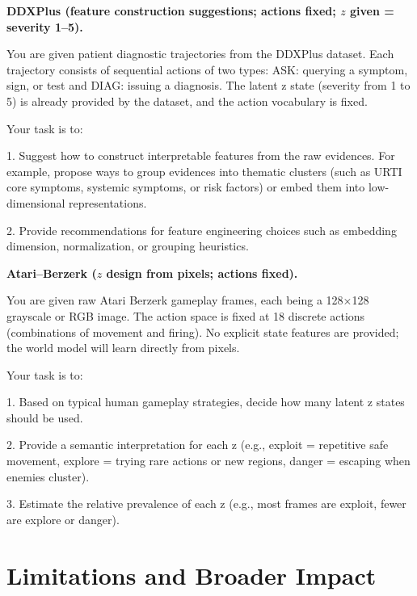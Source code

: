 \documentclass{article} %
\begin{document}
\noindent\textbf{DDXPlus (feature construction suggestions; actions fixed; $z$ given = severity 1--5).}\\[-0.3em]
\begin{PromptBox}
You are given patient diagnostic trajectories from the DDXPlus dataset.
Each trajectory consists of sequential actions of two types:
ASK: querying a symptom, sign, or test and DIAG: issuing a diagnosis.
The latent z state (severity from 1 to 5) is already provided by the dataset,
and the action vocabulary is fixed.

Your task is to:

1. Suggest how to construct interpretable features from the raw evidences.
   For example, propose ways to group evidences into thematic clusters
   (such as URTI core symptoms, systemic symptoms, or risk factors)
   or embed them into low-dimensional representations.

2. Provide recommendations for feature engineering choices such as
   embedding dimension, normalization, or grouping heuristics.
\end{PromptBox}


\noindent\textbf{Atari–Berzerk ($z$ design from pixels; actions fixed).}\\[-0.3em]
\begin{PromptBox}
You are given raw Atari Berzerk gameplay frames, each being a 128×128
grayscale or RGB image. The action space is fixed at 18 discrete actions
(combinations of movement and firing). No explicit state features are provided;
the world model will learn directly from pixels.

Your task is to:

1. Based on typical human gameplay strategies, decide how many latent z states
   should be used.

2. Provide a semantic interpretation for each z (e.g., exploit = repetitive safe
   movement, explore = trying rare actions or new regions, danger = escaping when
   enemies cluster).

3. Estimate the relative prevalence of each z (e.g., most frames are exploit,
   fewer are explore or danger).
\end{PromptBox}






\section{Limitations and Broader Impact}
\label{sec:limitations}
\end{document}
